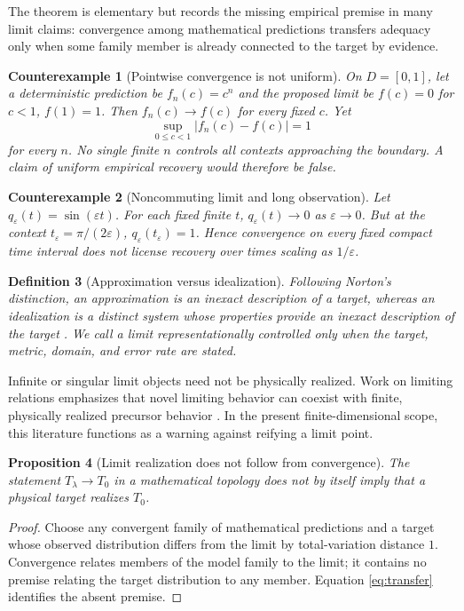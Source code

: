 \documentclass[11pt]{article}
\newtheorem{definition}{Definition}[section]
\newtheorem{proposition}[definition]{Proposition}
\newtheorem{counterexample}[definition]{Counterexample}
\begin{document}
The theorem is elementary but records the missing empirical premise in many limit claims: convergence among mathematical predictions transfers adequacy only when some family member is already connected to the target by evidence.

\begin{counterexample}[Pointwise convergence is not uniform]
On $D=[0,1]$, let a deterministic prediction be $f_n(c)=c^n$ and the proposed limit be $f(c)=0$ for $c<1$, $f(1)=1$.  Then $f_n(c)\to f(c)$ for every fixed $c$.  Yet
\[
 \sup_{0\leq c<1}|f_n(c)-f(c)|=1
\]
for every $n$.  No single finite $n$ controls all contexts approaching the boundary.  A claim of uniform empirical recovery would therefore be false.
\end{counterexample}

\begin{counterexample}[Noncommuting limit and long observation]
Let $q_\varepsilon(t)=\sin(\varepsilon t)$.  For each fixed finite $t$, $q_\varepsilon(t)\to0$ as $\varepsilon\to0$.  But at the context $t_\varepsilon=\pi/(2\varepsilon)$, $q_\varepsilon(t_\varepsilon)=1$.  Hence convergence on every fixed compact time interval does not license recovery over times scaling as $1/\varepsilon$.
\end{counterexample}

\begin{definition}[Approximation versus idealization]
Following Norton's distinction, an approximation is an inexact description of a target, whereas an idealization is a distinct system whose properties provide an inexact description of the target \cite{Norton2012}.  We call a limit \emph{representationally controlled} only when the target, metric, domain, and error rate are stated.
\end{definition}

Infinite or singular limit objects need not be physically realized.  Work on limiting relations emphasizes that novel limiting behavior can coexist with finite, physically realized precursor behavior \cite{Butterfield2011,ButterfieldBouatta2011}.  In the present finite-dimensional scope, this literature functions as a warning against reifying a limit point.

\begin{proposition}[Limit realization does not follow from convergence]
The statement $T_\lambda\to T_0$ in a mathematical topology does not by itself imply that a physical target realizes $T_0$.
\end{proposition}
\begin{proof}
Choose any convergent family of mathematical predictions and a target whose observed distribution differs from the limit by total-variation distance $1$.  Convergence relates members of the model family to the limit; it contains no premise relating the target distribution to any member.  Equation \eqref{eq:transfer} identifies the absent premise.
\end{proof}
\end{document}
